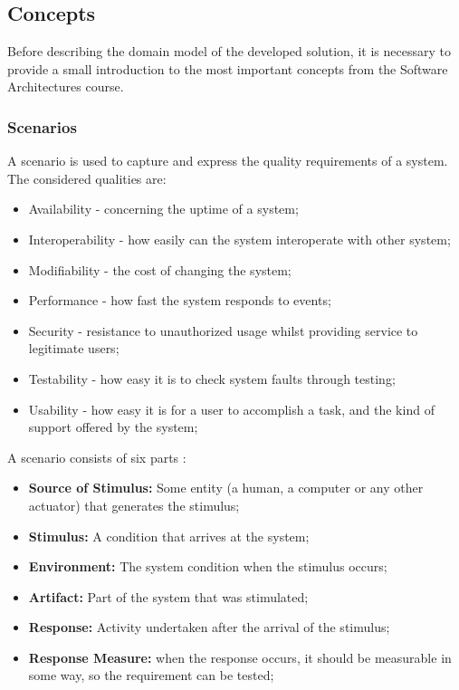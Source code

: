 \documentclass{llncs}
\begin{document}
\subsection{Concepts}
\label{section:SAConcepts}
Before describing the domain model of the developed solution, it is necessary to provide a small introduction to the most important concepts from the Software Architectures course.
 
\subsubsection{Scenarios}
\label{subsection:SAConceptsScenarios}
A scenario is used to capture and express the quality requirements of a system. The considered qualities are:
\begin{itemize}
\item Availability - concerning the uptime of a system;
\item Interoperability - how easily can the system interoperate with other system;
\item Modifiability - the cost of changing the system;
\item Performance - how fast the system responds to events;
\item Security - resistance to unauthorized usage whilst providing service to legitimate users;
\item Testability - how easy it is to check system faults through testing;
\item Usability - how easy it is for a user to accomplish a task, and the kind of support offered by the system;
\end{itemize}

A scenario consists of six parts \cite{bass2003software}:
\begin{itemize}
\item \textbf{Source of Stimulus:} Some entity (a human, a computer or any other actuator) that generates the stimulus;
\item \textbf{Stimulus:} A condition that arrives at the system;
\item \textbf{Environment:} The system condition when the stimulus occurs;
\item \textbf{Artifact:} Part of the system that was stimulated;
\item \textbf{Response:} Activity undertaken after the arrival of the stimulus;
\item \textbf{Response Measure:} when the response occurs, it should be measurable in some way, so the requirement can be tested;
\end{itemize}
\end{document}
